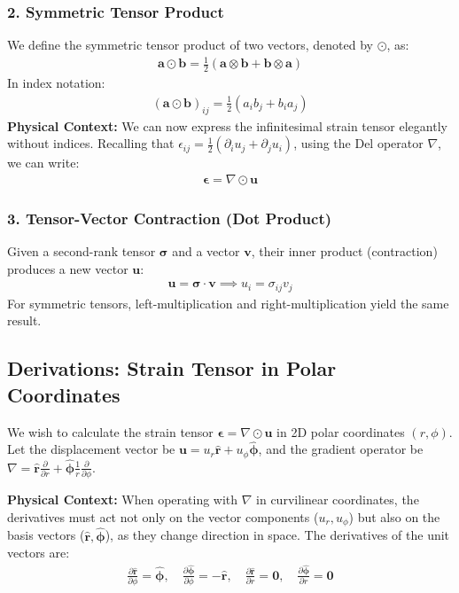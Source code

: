 \subsubsection*{2. Symmetric Tensor Product}
We define the symmetric tensor product of two vectors, denoted by $\odot$, as:
\begin{align}
    \mathbf{a} \odot \mathbf{b} = \frac{1}{2}(\mathbf{a} \otimes \mathbf{b} + \mathbf{b} \otimes \mathbf{a})
\end{align}
In index notation:
\begin{align}
    (\mathbf{a} \odot \mathbf{b})_{ij} = \frac{1}{2}(a_i b_j + b_i a_j)
\end{align}
\textbf{Physical Context:} We can now express the infinitesimal strain tensor elegantly without indices. Recalling that $\epsilon_{ij} = \frac{1}{2}(\partial_i u_j + \partial_j u_i)$, using the Del operator $\nabla$, we can write:
\begin{align}
    \boldsymbol{\epsilon} = \nabla \odot \mathbf{u}
\end{align}

\subsubsection*{3. Tensor-Vector Contraction (Dot Product)}
Given a second-rank tensor $\mathbf{\sigma}$ and a vector $\mathbf{v}$, their inner product (contraction) produces a new vector $\mathbf{u}$:
\begin{align}
    \mathbf{u} = \mathbf{\sigma} \cdot \mathbf{v} \implies u_i = \sigma_{ij} v_j
\end{align}
For symmetric tensors, left-multiplication and right-multiplication yield the same result. 

\subsection*{Derivations: Strain Tensor in Polar Coordinates}

We wish to calculate the strain tensor $\boldsymbol{\epsilon} = \nabla \odot \mathbf{u}$ in 2D polar coordinates $(r, \phi)$. 
Let the displacement vector be $\mathbf{u} = u_r \hat{\mathbf{r}} + u_\phi \hat{\boldsymbol{\phi}}$, and the gradient operator be $\nabla = \hat{\mathbf{r}} \frac{\partial}{\partial r} + \hat{\boldsymbol{\phi}} \frac{1}{r} \frac{\partial}{\partial \phi}$.

\textbf{Physical Context:} When operating with $\nabla$ in curvilinear coordinates, the derivatives must act not only on the vector components ($u_r, u_\phi$) but also on the basis vectors ($\hat{\mathbf{r}}, \hat{\boldsymbol{\phi}}$), as they change direction in space.
The derivatives of the unit vectors are:
\begin{align}
    \frac{\partial \hat{\mathbf{r}}}{\partial \phi} = \hat{\boldsymbol{\phi}}, \quad \frac{\partial \hat{\boldsymbol{\phi}}}{\partial \phi} = -\hat{\mathbf{r}}, \quad \frac{\partial \hat{\mathbf{r}}}{\partial r} = \mathbf{0}, \quad \frac{\partial \hat{\boldsymbol{\phi}}}{\partial r} = \mathbf{0}
\end{align}


